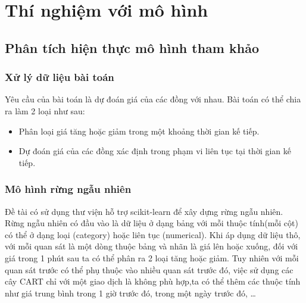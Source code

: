 \chapter{Thí nghiệm với mô hình}

\section{Phân tích hiện thực mô hình tham khảo}
\subsection{Xử lý dữ liệu bài toán}
Yêu cầu của bài toán là dự đoán giá của các đồng với nhau. Bài toán có thể chia ra làm 2 loại như sau:
\begin{itemize}
	\item Phân loại giá tăng hoặc giảm trong một khoảng thời gian kế tiếp.
	\item Dự đoán giá của các đồng xác định trong phạm vi liên tục tại thời gian kế tiếp.
\end{itemize}

\subsection{Mô hình rừng ngẫu nhiên}
 Đề tài có sử dụng thư viện hỗ trợ scikit-learn để xây dựng rừng ngẫu nhiên.
 Rừng ngẫu nhiên có đầu vào là dữ liệu ở dạng bảng với mỗi thuộc tính(mỗi cột) có thể ở dạng loại (category) hoặc liên tục (numerical). Khi áp dụng dữ liệu thô, với mỗi quan sát là một dòng thuộc bảng và nhãn là giá lên hoặc xuống, đối với giá trong 1 phút sau ta có thể phân ra 2 loại tăng hoặc giảm. Tuy nhiên với mỗi quan sát trước có thể phụ thuộc vào nhiều quan sát trước đó, việc sử dụng các cây CART chỉ với một giao dịch là không phù hợp,ta có thể thêm các thuộc tính như giá trung bình trong 1 giờ trước đó, trong một ngày trước đó, \dots
 
